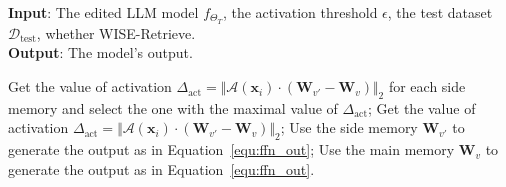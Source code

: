 \begin{algorithm}[h]
\caption{WISE Inference Stage}
\label{alg:wise_inference}
\textbf{Input}: The edited LLM model $f_{\Theta_T}$, the activation threshold $\epsilon$, the test dataset $\mathcal{D}_{\text{test}}$, whether WISE-Retrieve.\\
\textbf{Output}: The model's output.
\begin{algorithmic}[1] %
            \STATE Get the value of activation $\Delta_{\text{act}} = \Vert \mathcal{A}(\mathbf{x}_i) \cdot (\mathbf{W}_{v'} - \mathbf{W}_v) \Vert_2$ for each side memory and select the one with the maximal value of $\Delta_{\text{act}}$;
            \ELSE 
                \STATE Get the value of activation $\Delta_{\text{act}} = \Vert \mathcal{A}(\mathbf{x}_i) \cdot (\mathbf{W}_{v'} - \mathbf{W}_v) \Vert_2$;
        \ENDIF
            \STATE Use the side memory $\mathbf{W}_{v'}$ to generate the output as in Equation~\ref{equ:ffn_out};
        \ELSE
            \STATE Use the main memory $\mathbf{W}_{v}$ to generate the output as in Equation~\ref{equ:ffn_out}.
        \ENDIF
    \ENDFOR
\end{algorithmic}
\end{algorithm}




